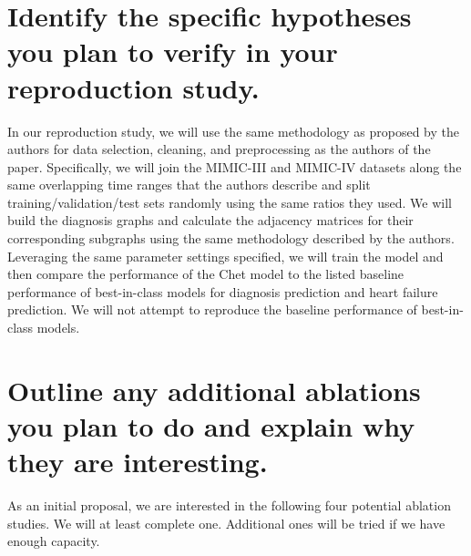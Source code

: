 \documentclass[11pt,a4paper]{article}
\begin{document}
\section{Identify the specific hypotheses you plan to verify in your
reproduction study.}
In our reproduction study, we will use the same methodology as proposed by the
authors for data selection, cleaning, and preprocessing as the authors of the
paper. Specifically, we will join the MIMIC-III and MIMIC-IV datasets along the
same overlapping time ranges that the authors describe and split
training/validation/test sets randomly using the same ratios they used. We will
build the diagnosis graphs and calculate the adjacency matrices for their
corresponding subgraphs using the same methodology described by the authors.
Leveraging the same parameter settings specified, we will train the model and
then compare the performance of the Chet model to the listed
baseline performance of best-in-class models for diagnosis prediction and heart
failure prediction. We will not attempt to reproduce the baseline performance of
best-in-class models.

\section{Outline any additional ablations you plan to do and
explain why they are interesting.}
As an initial proposal, we are interested in the following four potential ablation studies. We will at least complete one. Additional ones
will be tried if we have enough capacity.
\end{document}
